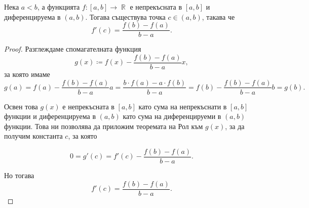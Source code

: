 \documentclass{../../common/topic}
\begin{document}
\begin{theorem}
  Нека \( a < b \), а функцията \( f: [a, b] \to \BbbR \) е непрекъсната в \( [a, b] \) и диференцируема в \( (a, b) \). Тогава съществува точка \( c \in (a, b) \), такава че
  \begin{equation*}
    f'(c) = \frac {f(b) - f(a)} {b-a}.
  \end{equation*}
\end{theorem}
\begin{proof}
  Разглеждаме спомагателната функция
  \begin{equation*}
    g(x) \coloneqq f(x) - \frac {f(b) - f(a)} {b-a} x,
  \end{equation*}
  за която имаме
  \begin{equation*}
    g(a)
    =
    f(a) - \frac {f(b) - f(a)} {b-a} a
    =
    \frac {b \cdot f(a) - a \cdot f(b)} {b-a}
    =
    f(b) - \frac {f(b) - f(a)} {b-a} b
    =
    g(b).
  \end{equation*}

  Освен това \( g(x) \) е непрекъсната в \( [a, b] \) като сума на непрекъснати в \( [a, b] \) функции и диференцируема в \( (a, b) \) като сума на диференцируеми в \( (a, b) \) функции. Това ни позволява да приложим теоремата на Рол към \( g(x) \), за да получим константа \( c \), за която

  \begin{equation*}
    0 = g'(c) = f'(c) - \frac {f(b) - f(a)} {b-a}.
  \end{equation*}

  Но тогава
  \begin{equation*}
    f'(c) = \frac {f(b) - f(a)} {b-a}.
  \end{equation*}
\end{proof}
\end{document}
